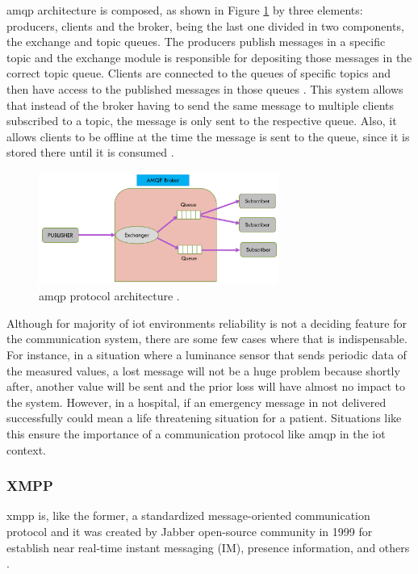 \ac{amqp} architecture is composed, as shown in Figure \ref{fig:amqp} by three elements: producers, clients and the broker, being the last one divided in two components, the exchange and topic queues. The producers publish messages in a specific topic and the exchange module is responsible for depositing those messages in the correct topic queue. Clients are connected to the queues of specific topics and then have access to the published messages in those queues \cite{Salman2013}. This system allows that instead of the broker having to send the same message to multiple clients subscribed to a topic, the message is only sent to the respective queue. Also, it allows clients to be offline at the time the message is sent to the queue, since it is stored there until it is consumed \cite{Al-fuqaha2015}.

\begin{figure}[H]
	\centering
	\includegraphics[width=0.7\textwidth]{figures/amqp.png}
	\caption{\ac{amqp} protocol architecture \cite{Badugu}.}
	\label{fig:amqp}
\end{figure}

Although for majority of \ac{iot} environments reliability is not a deciding feature for the communication system, there are some few cases where that is indispensable. For instance, in a situation where a luminance sensor that sends periodic data of the measured values, a lost message will not be a huge problem because shortly after, another value will be sent and the prior loss will have almost no impact to the system. However, in a hospital, if an emergency message in not delivered successfully could mean a life threatening situation for a patient. Situations like this ensure the importance of a communication protocol like \ac{amqp} in the \ac{iot} context.

\subsubsection{XMPP}

\acf{xmpp} is, like the former, a standardized message-oriented communication protocol and it was created by Jabber open-source community in 1999 for establish near real-time instant messaging (IM), presence information, and others \cite{Badugu}.

